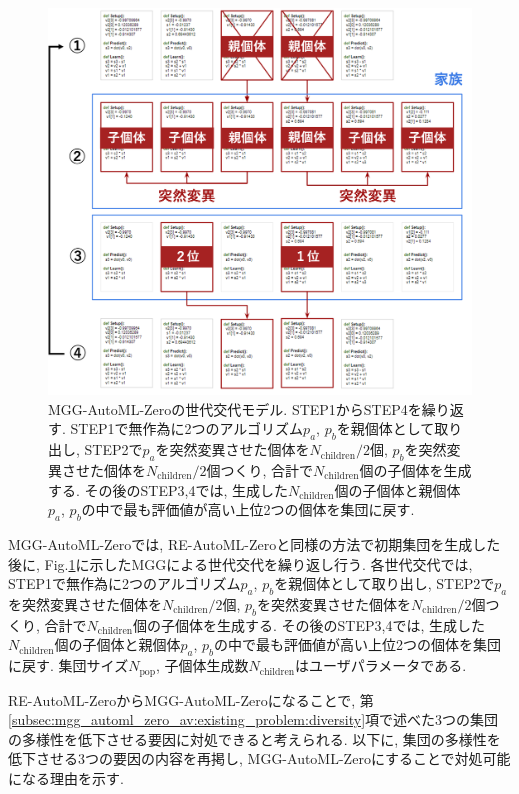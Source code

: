 \documentclass[11pt,oneside,openany,report]{jsbook}
\begin{document}
\begin{figure}[tbp]
  \centering
  \includegraphics[width=14cm]{mgg.png}
  \caption{MGG-AutoML-Zeroの世代交代モデル. STEP1からSTEP4を繰り返す. STEP1で無作為に2つのアルゴリズム$p_a$, $p_b$を親個体として取り出し, STEP2で$p_a$を突然変異させた個体を$N_\mathrm{children} / 2$個, $p_b$を突然変異させた個体を$N_\mathrm{children} / 2$個つくり, 合計で$N_\mathrm{children}$個の子個体を生成する. その後のSTEP3,4では, 生成した$N_\mathrm{children}$個の子個体と親個体$p_a$, $p_b$の中で最も評価値が高い上位2つの個体を集団に戻す. }
  \label{fig:mgg}
\end{figure}


MGG-AutoML-Zeroでは, RE-AutoML-Zeroと同様の方法で初期集団を生成した後に, Fig.\ref{fig:mgg}に示したMGGによる世代交代を繰り返し行う. 各世代交代では, STEP1で無作為に2つのアルゴリズム$p_a$, $p_b$を親個体として取り出し, STEP2で$p_a$を突然変異させた個体を$N_\mathrm{children} / 2$個, $p_b$を突然変異させた個体を$N_\mathrm{children} / 2$個つくり, 合計で$N_\mathrm{children}$個の子個体を生成する. その後のSTEP3,4では, 生成した$N_\mathrm{children}$個の子個体と親個体$p_a$, $p_b$の中で最も評価値が高い上位2つの個体を集団に戻す. 集団サイズ$N_\mathrm{pop}$, 子個体生成数$N_\mathrm{children}$はユーザパラメータである.

RE-AutoML-ZeroからMGG-AutoML-Zeroになることで, 第\ref{subsec:mgg_automl_zero_av:existing_problem:diversity}項で述べた3つの集団の多様性を低下させる要因に対処できると考えられる. 以下に, 集団の多様性を低下させる3つの要因の内容を再掲し, MGG-AutoML-Zeroにすることで対処可能になる理由を示す.
\end{document}
